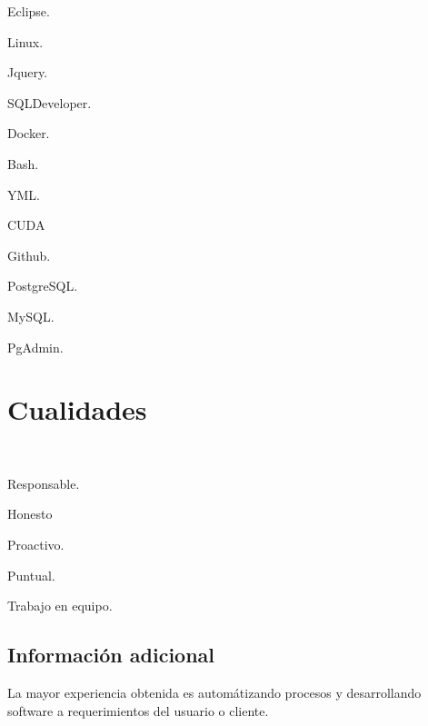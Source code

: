 \documentclass[letterpaper]{twentysecondcv} %
\begin{document}
\begin{multicols}{3}
	\begin{compactitem}[\color{blue}$\circ$]
		\item Eclipse. 
		\item Linux.
		\item Jquery.
		\item SQLDeveloper.

		\item Docker.
		\item Bash.
		\item YML.
		\item CUDA

		\item Github.
		\item PostgreSQL.
		\item MySQL.
		\item PgAdmin.
	\end{compactitem}
\end{multicols} 

\vspace{2\parskip}

\section{Cualidades} \\

\begin{multicols}{3}
	\begin{compactitem}[\color{blue}$\circ$]
		\item Responsable. 
		\item Honesto
		\item Proactivo.
		\item Puntual.
		\item Trabajo en equipo.
	\end{compactitem}
\end{multicols}

\subsection{Información adicional}

La mayor experiencia obtenida es automátizando procesos y  desarrollando software
a requerimientos del usuario o cliente.

\end{document}
